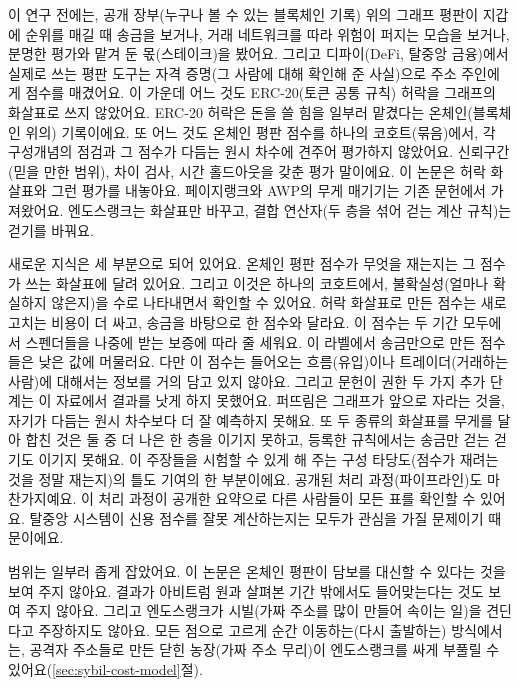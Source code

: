이 연구 전에는, 공개 장부(누구나 볼 수 있는 블록체인 기록) 위의 그래프 평판이 지갑에 순위를 매길 때 송금을 보거나, 거래 네트워크를 따라 위험이 퍼지는 모습을 보거나, 분명한 평가와 맡겨 둔 몫(스테이크)을 봤어요. 그리고 디파이(DeFi, 탈중앙 금융)에서 실제로 쓰는 평판 도구는 자격 증명(그 사람에 대해 확인해 준 사실)으로 주소 주인에게 점수를 매겼어요. 이 가운데 어느 것도 ERC-20(토큰 공통 규칙) 허락을 그래프의 화살표로 쓰지 않았어요. ERC-20 허락은 돈을 쓸 힘을 일부러 맡겼다는 온체인(블록체인 위의) 기록이에요. 또 어느 것도 온체인 평판 점수를 하나의 코호트(묶음)에서, 각 구성개념의 점검과 그 점수가 다듬는 원시 차수에 견주어 평가하지 않았어요. 신뢰구간(믿을 만한 범위), 차이 검사, 시간 홀드아웃을 갖춘 평가 말이에요. 이 논문은 허락 화살표와 그런 평가를 내놓아요. 페이지랭크와 AWP의 무게 매기기는 기존 문헌에서 가져왔어요. 엔도스랭크는 화살표만 바꾸고, 결합 연산자(두 층을 섞어 걷는 계산 규칙)는 걷기를 바꿔요.

새로운 지식은 세 부분으로 되어 있어요. 온체인 평판 점수가 무엇을 재는지는 그 점수가 쓰는 화살표에 달려 있어요. 그리고 이것은 하나의 코호트에서, 불확실성(얼마나 확실하지 않은지)을 수로 나타내면서 확인할 수 있어요. 허락 화살표로 만든 점수는 새로 고치는 비용이 더 싸고, 송금을 바탕으로 한 점수와 달라요. 이 점수는 두 기간 모두에서 스펜더들을 나중에 받는 보증에 따라 줄 세워요. 이 라벨에서 송금만으로 만든 점수들은 낮은 값에 머물러요. 다만 이 점수는 들어오는 흐름(유입)이나 트레이더(거래하는 사람)에 대해서는 정보를 거의 담고 있지 않아요. 그리고 문헌이 권한 두 가지 추가 단계는 이 자료에서 결과를 낫게 하지 못했어요. 퍼뜨림은 그래프가 앞으로 자라는 것을, 자기가 다듬는 원시 차수보다 더 잘 예측하지 못해요. 또 두 종류의 화살표를 무게를 달아 합친 것은 둘 중 더 나은 한 층을 이기지 못하고, 등록한 규칙에서는 송금만 걷는 걷기도 이기지 못해요. 이 주장들을 시험할 수 있게 해 주는 구성 타당도(점수가 재려는 것을 정말 재는지)의 틀도 기여의 한 부분이에요. 공개된 처리 과정(파이프라인)도 마찬가지예요. 이 처리 과정이 공개한 요약으로 다른 사람들이 모든 표를 확인할 수 있어요. 탈중앙 시스템이 신용 점수를 잘못 계산하는지는 모두가 관심을 가질 문제이기 때문이에요.

범위는 일부러 좁게 잡았어요. 이 논문은 온체인 평판이 담보를 대신할 수 있다는 것을 보여 주지 않아요. 결과가 아비트럼 원과 살펴본 기간 밖에서도 들어맞는다는 것도 보여 주지 않아요. 그리고 엔도스랭크가 시빌(가짜 주소를 많이 만들어 속이는 일)을 견딘다고 주장하지도 않아요. 모든 점으로 고르게 순간 이동하는(다시 출발하는) 방식에서는, 공격자 주소들로 만든 닫힌 농장(가짜 주소 무리)이 엔도스랭크를 싸게 부풀릴 수 있어요(\ref{sec:sybil-cost-model}절).

